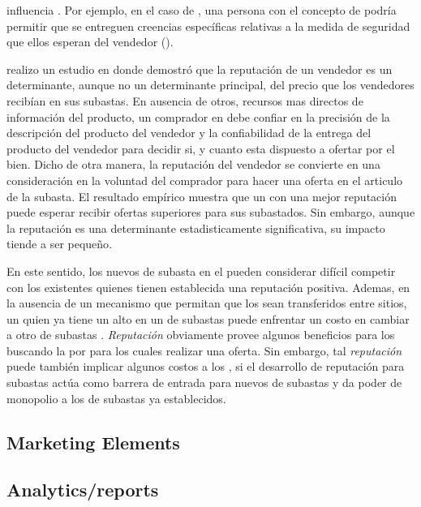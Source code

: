 \security influencia \trust. Por ejemplo, en el caso de \amazon, una persona \familiarity con el concepto de \secureintcom podría permitir que se entreguen creencias específicas relativas a la medida de seguridad que ellos esperan del vendedor (\trust)\cite{gefen2000commerce}.

\ebay realizo un estudio en donde demostró que la reputación \ecommerce de un vendedor es un determinante, aunque no un determinante principal, del precio que los vendedores recibían en sus subastas. En ausencia de otros, recursos mas directos de información del producto, un comprador en \internet debe confiar en la precisión de la descripción del producto del vendedor y la confiabilidad de la entrega del producto del vendedor para decidir si, y cuanto esta dispuesto a ofertar por el bien. Dicho de otra manera, la reputación del vendedor se convierte en una consideración en la voluntad del comprador para hacer una oferta en el articulo de la subasta. El resultado empírico muestra que un \seller con una mejor reputación puede esperar recibir ofertas superiores para sus \itemscommerce subastados. Sin embargo, aunque la reputación es una determinante estadisticamente significativa, su impacto tiende a ser pequeño\cite{melnik2002does}.

En este sentido, los nuevos \seller de subasta en el \websites pueden considerar difícil competir con los \sellers existentes quienes tienen establecida una reputación positiva. Ademas, en la ausencia de un mecanismo que permitan que los \ratings sean transferidos entre sitios, un \seller quien ya tiene un alto \rating en un \website de subastas \online puede enfrentar un costo en cambiar a otro \website de subastas \online. \textit{Reputación} obviamente provee algunos beneficios para los \consumers buscando  la \internet por \itemscommerce para los cuales realizar una oferta. Sin embargo, tal \textit{reputación} puede también implicar algunos costos a los \consumers, si el desarrollo de reputación para subastas \online actúa como barrera de entrada para nuevos \websites de  subastas \online  y da poder de monopolio a los \websites de subastas \online ya establecidos\cite{melnik2002does}.

\subsection{Marketing Elements}

\subsection{Analytics/reports}




